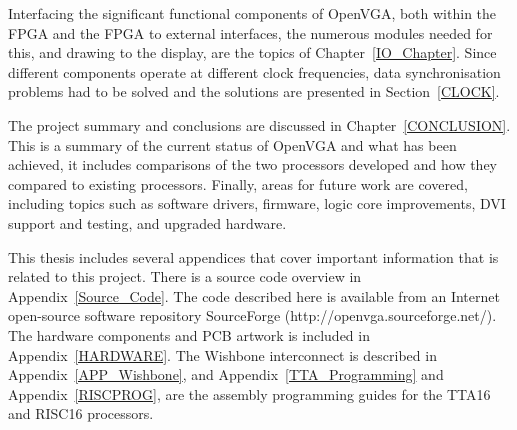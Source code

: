Interfacing the significant functional components of OpenVGA, both within the
FPGA and the FPGA to external interfaces, the numerous modules needed for this,
and drawing to the display, are the topics of Chapter~\ref{IO_Chapter}. Since
different components operate at different clock frequencies, data synchronisation
problems had to be solved and the solutions are presented in Section~\ref{CLOCK}.

The project summary and conclusions are discussed in Chapter~\ref{CONCLUSION}.
This is a summary of the current status of OpenVGA and what has been achieved, it
includes comparisons of the two processors developed and how they compared to
existing processors. Finally, areas for future work are covered, including
topics such as software drivers, firmware, logic core improvements, DVI support
and testing, and upgraded hardware.

This thesis includes several appendices that cover important information that is
related to this project. There is a source code overview in
Appendix~\ref{Source_Code}. The code described here is available from an Internet
open-source software repository SourceForge (http://openvga.sourceforge.net/).
The hardware components and PCB artwork is included in Appendix~\ref{HARDWARE}.
The Wishbone interconnect is described in Appendix~\ref{APP_Wishbone}, and
Appendix~\ref{TTA_Programming} and Appendix~\ref{RISCPROG}, are the assembly
programming guides for the TTA16 and RISC16 processors.
